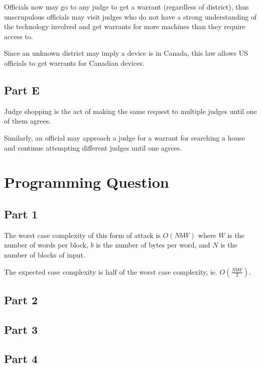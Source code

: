 \documentclass[12pt]{article}
\begin{document}
Officials now may go to any judge to get a warrant (regardless of district), thus unscrupulous officials may visit judges who do not have a strong understanding of the technology involved and get warrants for more machines than they require access to.

Since an unknown district may imply a device is in Canada, this law allows US officials to get warrants for Canadian devices.

\subsection*{Part E}
Judge shopping is the act of making the same request to multiple judges until one of them agrees.

Similarly, an official may approach a judge for a warrant for searching a house and continue attempting different judges until one agrees.

\section*{Programming Question}
\subsection*{Part 1}
The worst case complexity of this form of attack is $O(NbW)$ where $W$ is the number of words per block, $b$ is the number of bytes per word, and $N$ is the number of blocks of input.

The expected case complexity is half of the worst case complexity, ie. $O(\frac{NbW}{2})$.

\subsection*{Part 2}

\subsection*{Part 3}

\subsection*{Part 4}
\end{document}
